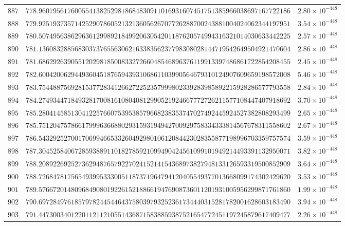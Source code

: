 \documentclass[12pt,reqno]{amsart}
\theoremstyle{remark}
\begin{document}
\begin{longtable}{clc}
$887$ & $778.9607956176005541382529818684830911016931607451751385966038697167722186$ & $2.80\times 10^{-448}$ \\
$888$ & $779.9251937357142529078605213213605626707726288700243881004024062344197951$ & $3.54\times 10^{-448}$ \\
$889$ & $780.5074956386296361299892184992063054201187620574994316321014030633442225$ & $2.57\times 10^{-448}$ \\
$890$ & $781.1360832885683037376556306216338356237798308028144719542649504921470604$ & $2.86\times 10^{-448}$ \\
$891$ & $781.6862926390551202981850083327266048546896376119913397486861722854208455$ & $2.45\times 10^{-448}$ \\
$892$ & $782.6004200629449360451876594393106861103990564679310124907609659198572008$ & $5.46\times 10^{-448}$ \\
$893$ & $783.7544887569281537728341266272252357999802339283985892215928286577793558$ & $2.84\times 10^{-448}$ \\
$894$ & $784.2749344718493281700816108040812990521924667772726211577108447407918692$ & $3.70\times 10^{-448}$ \\
$895$ & $785.2804145851304122576607539538579668238353747027492445924527382808293499$ & $2.65\times 10^{-448}$ \\
$896$ & $785.7512047578661799963668802931593194942700929758334333814567678311558602$ & $2.67\times 10^{-448}$ \\
$897$ & $786.5432925270017069946653326049298010612084423028355877198996703359757574$ & $3.59\times 10^{-448}$ \\
$898$ & $787.3045258406728593889110182785921099490424561099101949214493391132950071$ & $3.82\times 10^{-448}$ \\
$899$ & $788.2089226925273629487657922702415214154368973827948133126593319500852909$ & $3.64\times 10^{-448}$ \\
$900$ & $788.7268478175654939953330051187371964794120405549377013668099174302429620$ & $3.53\times 10^{-448}$ \\
$901$ & $789.5766720148096849080192261521886619476908736011201931005956299871761860$ & $1.99\times 10^{-448}$ \\
$902$ & $790.6972849761857978244544643758039793252361734440315281782001628603183490$ & $3.94\times 10^{-448}$ \\
$903$ & $791.4473003401220112112105514368715838859387521654772451197245879617409477$ & $2.26\times 10^{-448}$ \\

\end{longtable}
\end{document}
